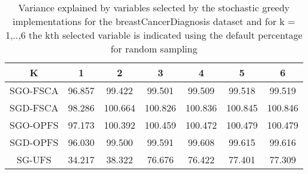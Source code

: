 \begin{table}
	\begin{center}
		\begin{tabular}{c c c c c c c}
			K & 1 & 2 & 3 & 4 & 5 & 6 \\
			\hline
			SGO-FSCA & 96.857 & 99.422 & 99.501 & 99.509 & 99.518 & 99.519 \\
			SGD-FSCA & 98.286 & 100.664 & 100.826 & 100.836 & 100.845 & 100.846 \\
			SGO-OPFS & 97.173 & 100.392 & 100.459 & 100.472 & 100.479 & 100.479 \\
			SGD-OPFS & 96.030 & 99.500 & 99.591 & 99.608 & 99.615 & 99.616 \\
			SG-UFS & 34.217 & 38.322 & 76.676 & 76.422 & 77.401 & 77.309 \\
		\end{tabular}
	\end{center}
	\caption{Variance explained by variables selected by the stochastic greedy implementations for the breastCancerDiagnosis dataset and for k = 1,..,6 the kth selected variable is indicated using the default percentage for random sampling}
\end{table}